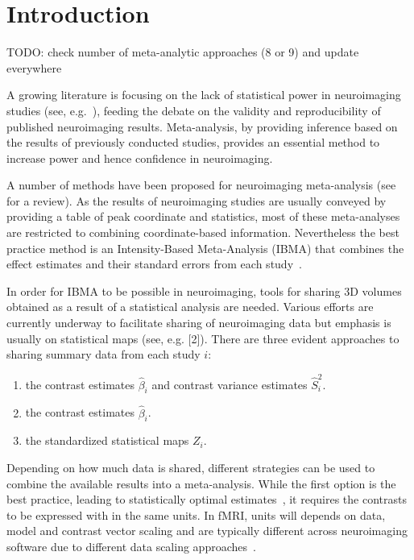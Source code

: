 \documentclass{llncs}
\newcommand{\effectvector}{\hat\beta}
\newcommand{\effect}[1][i]{\effectvector_{#1}}
\newcommand{\vareffect}[1][i]{\hat S^2_{#1}}
\newcommand{\zeffect}[1][i]{Z_{#1}}
\begin{document}
\section{Introduction}

TODO: check number of meta-analytic approaches (8 or 9) and update everywhere

A growing literature is focusing on the lack of statistical power in neuroimaging studies (see, e.g.~\cite{Button2013}), feeding the debate on the validity and reproducibility of published neuroimaging results. Meta-analysis, by providing inference based on the results of previously conducted studies, provides an essential method to increase power and hence confidence in neuroimaging.

A number of methods have been proposed for neuroimaging meta-analysis (see~\cite{Radua2012} for a review). As the results of neuroimaging studies are usually conveyed by providing a table of peak coordinate and statistics, most of these meta-analyses are restricted to combining coordinate-based information. Nevertheless the best practice method is an Intensity-Based Meta-Analysis (IBMA) that combines the effect estimates and their standard errors from each study~\cite{Salimi-khorshidi2009}. 

In order for IBMA to be possible in neuroimaging, tools for sharing 3D volumes obtained as a result of a statistical analysis are needed. Various efforts are currently underway to facilitate sharing of neuroimaging data but emphasis is usually on statistical maps (see, e.g. [2]). There are three evident approaches to sharing summary data from each study $i$:
\begin{enumerate}
	\item the contrast estimates $\effect$ and contrast variance estimates $\vareffect$.
	\item the contrast estimates $\effect$.	
	\item the standardized statistical maps $\zeffect$.		
\end{enumerate}

Depending on how much data is shared, different strategies can be used to combine the available results into a meta-analysis. While the first option is the best practice, leading to statistically optimal estimates~\cite{Cummings2004}, it requires the contrasts to be expressed with in the same units. In fMRI, units will depends on data, model and contrast vector scaling and are typically different across neuroimaging software due to different data scaling approaches~\cite{Nichols2012units}.
\end{document}
